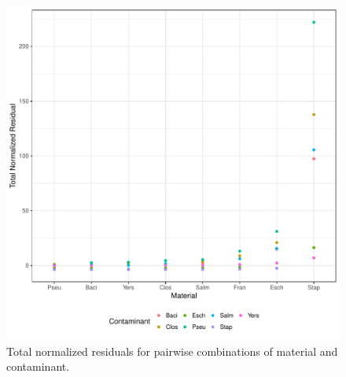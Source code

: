 \documentclass[fleqn,10pt,lineno]{wlpeerj}\usepackage[]{graphicx}\usepackage[]{color}
\makeatletter
\def\maxwidth{ %
  \ifdim\Gin@nat@width>\linewidth
    \linewidth
  \else
    \Gin@nat@width
  \fi
}
\newenvironment{knitrout}{}{} %
\makeatother
\begin{document}
\begin{knitrout}
\color{fgcolor}\begin{figure}
\includegraphics[width=\maxwidth]{figure/contam_resid-1} \caption[Total normalized residuals for pairwise combinations of material and contaminant]{Total normalized residuals for pairwise combinations of material and contaminant.}\label{fig:contam_resid}
\end{figure}


\end{knitrout}
\end{document}
